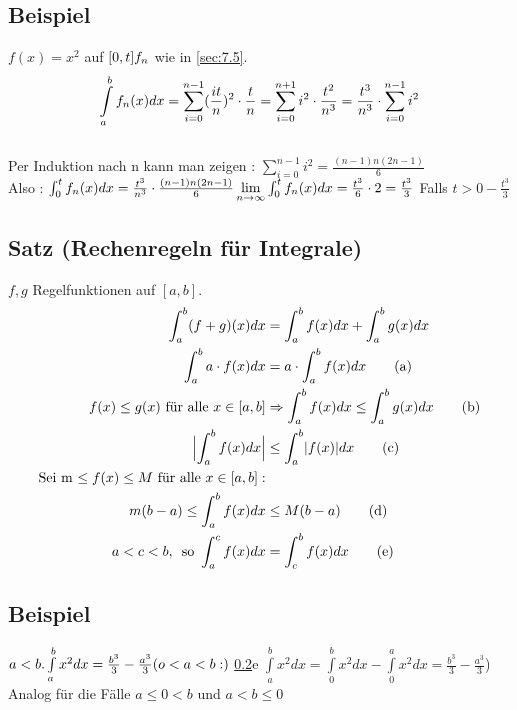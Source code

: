 \subsection{Beispiel}\label{sec:7.8}
$f(x) = x^2$ auf $[0,t]\\
f_n$ wie in \ref{sec:7.5}.\\
\[\int\limits_{a}^b f_n(x)dx = \sum\limits_{i=0}^{n-1}(\frac{it}{n})^2 \cdot \frac{t}{n} =\sum\limits_{i=0}^{n+1} i^2 \cdot \frac{t^2}{n^3} = \frac{t^3}{n^3}\cdot \sum\limits_{i=0}^{n-1} i^2\]\\
Per Induktion nach n kann man zeigen : $\sum\limits_{i=0}^{n-1} i^2 = \frac{(n-1)n(2n-1)}{6}$\\
Also : $\int_{0}^{t} f_n(x)dx = \frac{t^3}{n^3} \cdot \frac{(n-1)n(2n-1)}{6}\\
\lim\limits_{n \to \infty} \int_{0}^{t} f_n(x)dx = \frac{t^3}{6} \cdot 2 = \frac{t^3}{3}$
Falls $ t > 0 -\frac{t^3}{3}$
\subsection{Satz (Rechenregeln für Integrale)}\label{sec:7.9}
$f,g$ Regelfunktionen auf $[a,b]$.
\begin{align}
\int_{a}^{b} (f+g)(x)dx &= \int_{a}^{b} f(x)dx + \int_{a}^{b} g(x)dx \notag\\
\int_{a}^{b} a \cdot f(x)dx &= a \cdot \int_{a}^{b} f(x)dx  \tag{a}\\
f(x) \le g(x) \text{ für alle } x \in [a,b] &\Rightarrow \int_{a}^{b} f(x)dx \le \int_{a}^{b} g(x)dx \tag{b}\\
\Bigl\lvert\int_{a}^{b} f(x)dx\Bigr\rvert &\le \int_{a}^{b} \lvert f(x) \rvert dx \tag{c}\\
\text{Sei m $\le f(x)$} \le M\text{ für alle $x \in [a,b]$}: \notag \\
m(b-a) \le \int_{a}^{b} f(x)dx &\le M(b-a) \tag{d}\\
a < c < b,\, \text{ so } \int_{a}^{c} f(x)dx &= \int_{c}^{b} f(x)dx \tag{e}
\end{align}
\subsection{Beispiel}
$a < b. \int\limits_{a}^{b} x^2 dx = \frac{b^3}{3} - \frac{a^3}{3}\\
(o < a < b :)$ \ref{sec:7.9}e $\int\limits_{a}^{b} x^2 dx = \int\limits_{0}^{b} x^2 dx - \int\limits_{0}^{a} x^2 dx = \frac{b^3}{3} - \frac{a^3}{3}$)\\
Analog für die Fälle $a \le 0 < b$ und $a < b \le 0$
